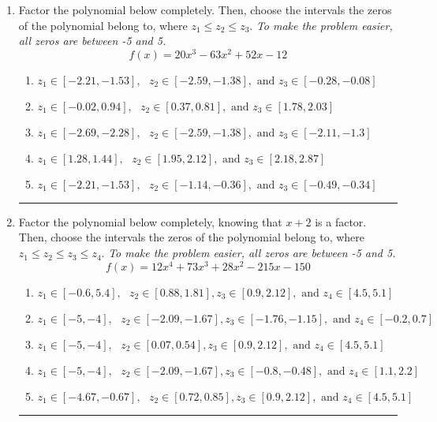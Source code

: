 \documentclass[14pt]{extbook}
\newcommand{\litem}[1]{\item#1\hspace*{-1cm}\rule{\textwidth}{0.4pt}}
\begin{document}
\begin{enumerate}
{\begin{enumerate}[label=\Alph*.]
\end{enumerate} }
\litem{
Factor the polynomial below completely. Then, choose the intervals the zeros of the polynomial belong to, where $z_1 \leq z_2 \leq z_3$. \textit{To make the problem easier, all zeros are between -5 and 5.}\[ f(x) = 20x^{3} -63 x^{2} +52 x -12 \]\begin{enumerate}[label=\Alph*.]
\item \( z_1 \in [-2.21, -1.53], \text{   }  z_2 \in [-2.59, -1.38], \text{   and   } z_3 \in [-0.28, -0.08] \)
\item \( z_1 \in [-0.02, 0.94], \text{   }  z_2 \in [0.37, 0.81], \text{   and   } z_3 \in [1.78, 2.03] \)
\item \( z_1 \in [-2.69, -2.28], \text{   }  z_2 \in [-2.59, -1.38], \text{   and   } z_3 \in [-2.11, -1.3] \)
\item \( z_1 \in [1.28, 1.44], \text{   }  z_2 \in [1.95, 2.12], \text{   and   } z_3 \in [2.18, 2.87] \)
\item \( z_1 \in [-2.21, -1.53], \text{   }  z_2 \in [-1.14, -0.36], \text{   and   } z_3 \in [-0.49, -0.34] \)

\end{enumerate} }
\litem{
Factor the polynomial below completely, knowing that $x+2$ is a factor. Then, choose the intervals the zeros of the polynomial belong to, where $z_1 \leq z_2 \leq z_3 \leq z_4$. \textit{To make the problem easier, all zeros are between -5 and 5.}\[ f(x) = 12x^{4} +73 x^{3} +28 x^{2} -215 x -150 \]\begin{enumerate}[label=\Alph*.]
\item \( z_1 \in [-0.6, 5.4], \text{   }  z_2 \in [0.88, 1.81], z_3 \in [0.9, 2.12], \text{   and   } z_4 \in [4.5, 5.1] \)
\item \( z_1 \in [-5, -4], \text{   }  z_2 \in [-2.09, -1.67], z_3 \in [-1.76, -1.15], \text{   and   } z_4 \in [-0.2, 0.7] \)
\item \( z_1 \in [-5, -4], \text{   }  z_2 \in [0.07, 0.54], z_3 \in [0.9, 2.12], \text{   and   } z_4 \in [4.5, 5.1] \)
\item \( z_1 \in [-5, -4], \text{   }  z_2 \in [-2.09, -1.67], z_3 \in [-0.8, -0.48], \text{   and   } z_4 \in [1.1, 2.2] \)
\item \( z_1 \in [-4.67, -0.67], \text{   }  z_2 \in [0.72, 0.85], z_3 \in [0.9, 2.12], \text{   and   } z_4 \in [4.5, 5.1] \)


\end{enumerate}}
\end{enumerate}
\end{document}
